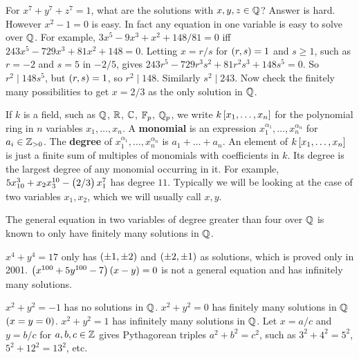\begin{example*}
For $ x^7 + y^7 + z^7 = 1 $, what are the solutions with $ x, y, z \in \mathbb{Q} $? Answer is hard. However $ x^2 - 1 = 0 $ is easy. In fact any equation in one variable is easy to solve over $ \mathbb{Q} $. For example, $ 3x^5 - 9x^3 + x^2 + 148 / 81 = 0 $ iff $ 243x^5 - 729x^3 + 81x^2 + 148 = 0 $. Letting $ x = r / s $ for $ \br{r, s} = 1 $ and $ s \ge 1 $, such as $ r = -2 $ and $ s = 5 $ in $ -2 / 5 $, gives $ 243r^5 - 729r^3s^2 + 81r^2s^3 + 148s^5 = 0 $. So $ r^2 \mid 148s^5 $, but $ \br{r, s} = 1 $, so $ r^2 \mid 148 $. Similarly $ s^2 \mid 243 $. Now check the finitely many possibilities to get $ x = 2 / 3 $ as the only solution in $ \mathbb{Q} $.
\end{example*}

If $ k $ is a field, such as $ \mathbb{Q} $, $ \mathbb{R} $, $ \mathbb{C} $, $ \mathbb{F}_p $, $ \mathbb{Q}_p $, we write $ k\sbr{x_1, \dots, x_n} $ for the polynomial ring in $ n $ variables $ x_1, \dots, x_n $. A \textbf{monomial} is an expression $ x_1^{\alpha_1}, \dots, x_n^{\alpha_n} $ for $ a_i \in \mathbb{Z}_{> 0} $. The \textbf{degree} of $ x_1^{\alpha_1}, \dots, x_n^{\alpha_n} $ is $ a_1 + \dots + a_n $. An element of $ k\sbr{x_1, \dots, x_n} $ is just a finite sum of multiples of monomials with coefficients in $ k $. Its degree is the largest degree of any monomial occurring in it. For example, $ 5x_{10}^3 + x_2x_3^{10} - \br{2 / 3}x_1^7 $ has degree $ 11 $. Typically we will be looking at the case of two variables $ x_1, x_2 $, which we will usually call $ x, y $.

\begin{theorem}
The general equation in two variables of degree greater than four over $ \mathbb{Q} $ is known to only have finitely many solutions in $ \mathbb{Q} $.
\end{theorem}

\begin{example*}
$ x^4 + y^4 = 17 $ only has $ \br{\pm 1, \pm 2} $ and $ \br{\pm 2, \pm 1} $ as solutions, which is proved only in 2001. $ \br{x^{100} + 5y^{100} - 7}\br{x - y} = 0 $ is not a general equation and has infinitely many solutions.
\end{example*}

\begin{example*}
$ x^2 + y^2 = -1 $ has no solutions in $ \mathbb{Q} $. $ x^2 + y^2 = 0 $ has finitely many solutions in $ \mathbb{Q} $ $ \br{x = y = 0} $. $ x^2 + y^2 = 1 $ has infinitely many solutions in $ \mathbb{Q} $. Let $ x = a / c $ and $ y = b / c $ for $ a, b, c \in \mathbb{Z} $ gives Pythagorean triples $ a^2 + b^2 = c^2 $, such as $ 3^2 + 4^2 = 5^2 $, $ 5^2 + 12^2 = 13^2 $, etc.
\end{example*}

